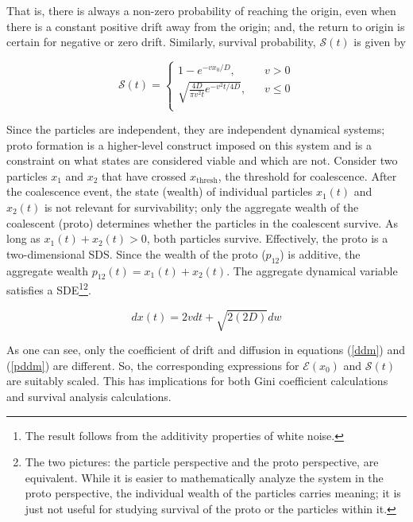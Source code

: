 \noindent That is, there is always a non-zero probability of reaching the origin, even when there is a constant positive drift away from the origin; and, the return to origin is certain for negative or zero drift.  Similarly, survival probability, $\mathcal{S}(t)$ is given by 

\begin{equation}\label{s}
\mathcal{S}(t) = \begin{cases}
1 - e^{-v x_0/D}\text{, } & \text{ } v >0 \\
\sqrt{\frac{4D}{\pi v^2 t} e^{-v^2 t/4 D}}\text{, } & \text{ } v \leq 0 \\
\end{cases}
\end{equation}

Since the particles are independent, they are independent dynamical systems; proto formation is a higher-level construct imposed on this system and is a constraint on what states are considered viable and which are not. Consider two particles $x_1$ and  $x_2$ that have crossed $x_{\textrm{thresh}}$, the threshold for coalescence. After the coalescence event, the state (wealth) of individual particles $x_1(t)$ and  $x_2(t)$ is not relevant for survivability; only the aggregate wealth of the coalescent (proto) determines whether the particles in the coalescent survive. As long as $x_1(t) + x_2(t) >0$, both particles survive. Effectively, the proto is a two-dimensional SDS. Since the wealth of the proto ($p_{12}$) is additive, the aggregate wealth $p_{12}(t) = x_1(t) + x_2(t) $. The aggregate dynamical variable satisfies a SDE\footnote{The result follows from the additivity properties of white noise.}\footnote{The two pictures: the particle perspective and the proto perspective, are equivalent. While it is easier to mathematically analyze the system in the proto perspective, the individual wealth of the particles carries meaning; it is just not useful for studying survival of the proto or the particles within it.}.  

\begin{equation}\label{pddm}
dx(t) = 2vdt + \sqrt{2(2D)} dw
\end{equation}

As one can see, only the coefficient of drift and diffusion in equations (\ref{ddm}) and (\ref{pddm}) are different. So, the corresponding expressions for $\mathcal{E}(x_0)$ and $\mathcal{S}(t)$ are suitably scaled. This has implications for both Gini coefficient calculations and survival analysis calculations. 

